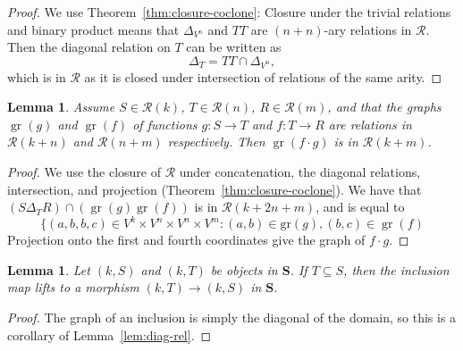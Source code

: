 \documentclass[11pt, a4paper, twoside,leqno]{amsart}
\newcommand{\cat}[1]{\mathbf{#1}}
\numberwithin{equation}{section}
\theoremstyle{plain}
\newtheorem{Lemma}[Thm]{Lemma}
\theoremstyle{definition}
\DeclareMathOperator{\gr}{gr}
\begin{document}
\begin{proof}
  We use Theorem~\ref{thm:closure-coclone}: Closure under the trivial
  relations and binary product means that \(\Delta_{V^{n}}\) and \(T T\) are \((n+n)\)-ary relations in
  \(\mathscr{R}\). Then the diagonal relation on \(T\) can be written as
  \begin{equation}
    \label{eq:13}
    \Delta_{T} = T T \cap \Delta_{V^{n}},
  \end{equation}
  which is in \(\mathscr{R}\) as it is closed under intersection of relations of the same arity.  %
\end{proof}



\begin{Lemma}
  \label{lem:S-closed-composition}
  Assume \(S \in \mathscr{R}(k)\), \(T \in \mathscr{R}(n)\), \(R \in
  \mathscr{R}(m)\), and that the
  graphs \(\gr (g)\) and \(\gr (f)\) of functions \(g \colon S
  \rightarrow T\) and \(f \colon T \rightarrow R\) are relations in
  \(\mathscr{R}(k+n)\) and \(\mathscr{R}(n+m)\) respectively. Then
  \(\gr( f \cdot g)\) is in \(\mathscr{R}(k+m) 
  \).
\end{Lemma}

\begin{proof}
  We use the closure of \(\mathscr{R} 
  \) under concatenation, the diagonal relations, intersection, and
  projection (Theorem~\ref{thm:closure-coclone}). We have that 
  \( (S \Delta_{T}  R) \cap (\gr (g)  \gr (f)) \) is
  in \(\mathscr{R} (k+2n+m)
  \), and is equal to
  \begin{equation*}
    \label{eq:13}
    \{(a,b,b,c) \in V^k \times V^n \times V^n \times V^m : (a,b) \in \mathrm{gr}(g), (b,c) \in \gr(f)
  \end{equation*}
  Projection onto the first and fourth coordinates give the graph of
  \(f\cdot g\).
\end{proof}


\begin{Lemma}
  \label{lem:inclusion-morphisms-cc}
  Let \((k,S)\) and \((k,T)\) be objects in \(\cat{S}\). If
  \(T\subseteq S\), then the inclusion map lifts to a morphism \((k,T) \rightarrow
  (k,S)\) in \(\cat{S}\).
\end{Lemma}

\begin{proof}
  The graph of an inclusion is simply the diagonal of the domain, so this is a corollary of Lemma~\ref{lem:diag-rel}.
\end{proof}
\end{document}
